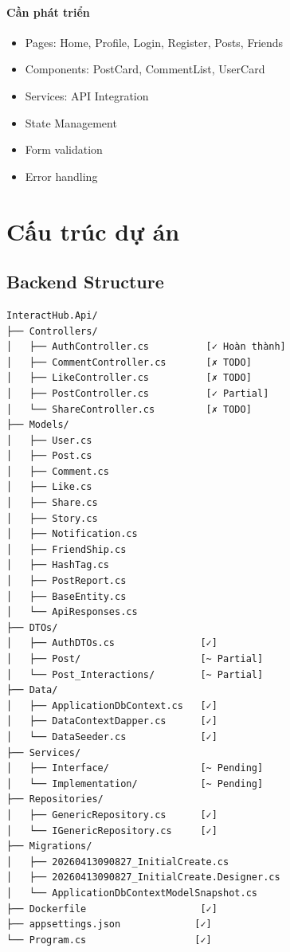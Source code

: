 \documentclass[12pt,a4paper]{report}
\begin{document}
\subsubsection{Cần phát triển}
\begin{itemize}
    \item Pages: Home, Profile, Login, Register, Posts, Friends
    \item Components: PostCard, CommentList, UserCard
    \item Services: API Integration
    \item State Management
    \item Form validation
    \item Error handling
\end{itemize}

\newpage

\chapter{Cấu trúc dự án}

\section{Backend Structure}
\begin{verbatim}
InteractHub.Api/
├── Controllers/
│   ├── AuthController.cs          [✓ Hoàn thành]
│   ├── CommentController.cs       [✗ TODO]
│   ├── LikeController.cs          [✗ TODO]
│   ├── PostController.cs          [✓ Partial]
│   └── ShareController.cs         [✗ TODO]
├── Models/
│   ├── User.cs
│   ├── Post.cs
│   ├── Comment.cs
│   ├── Like.cs
│   ├── Share.cs
│   ├── Story.cs
│   ├── Notification.cs
│   ├── FriendShip.cs
│   ├── HashTag.cs
│   ├── PostReport.cs
│   ├── BaseEntity.cs
│   └── ApiResponses.cs
├── DTOs/
│   ├── AuthDTOs.cs               [✓]
│   ├── Post/                     [~ Partial]
│   └── Post_Interactions/        [~ Partial]
├── Data/
│   ├── ApplicationDbContext.cs   [✓]
│   ├── DataContextDapper.cs      [✓]
│   └── DataSeeder.cs             [✓]
├── Services/
│   ├── Interface/                [~ Pending]
│   └── Implementation/           [~ Pending]
├── Repositories/
│   ├── GenericRepository.cs      [✓]
│   └── IGenericRepository.cs     [✓]
├── Migrations/
│   ├── 20260413090827_InitialCreate.cs
│   ├── 20260413090827_InitialCreate.Designer.cs
│   └── ApplicationDbContextModelSnapshot.cs
├── Dockerfile                    [✓]
├── appsettings.json             [✓]
└── Program.cs                   [✓]
\end{verbatim}
\end{document}
